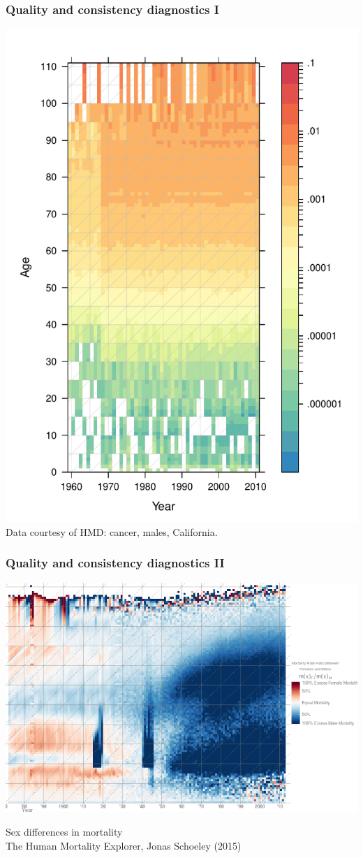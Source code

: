 \documentclass[20pt]{beamer}
\begin{document}
\begin{frame}
\frametitle{Quality and consistency diagnostics I}
\includegraphics[scale=.8]{Figures/APC_males_CA_cancer.pdf}\\
Data courtesy of HMD: cancer, males, California.
\end{frame}

\begin{frame}
\frametitle{Quality and consistency diagnostics II}
\begin{center}
\includegraphics[scale=.8]{Figures/Schoeley2.png}
\end{center}
Sex differences in mortality\\The Human Mortality Explorer, Jonas Schoeley
(2015)
\end{frame}
\end{document}
